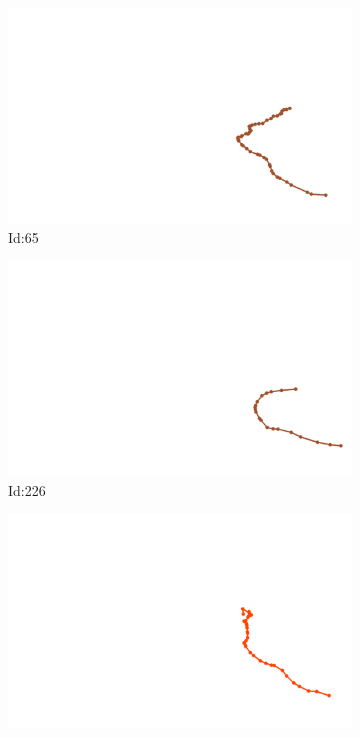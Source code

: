 \documentclass[12pt,twoside]{report}
\begin{document}
\begin{figure}
\centering
\begin{subfigure}[b]{0.20\textwidth}
\centering
\includegraphics[width=\textwidth]{../../trajectories/65.png}
\caption{Id:65}
\end{subfigure}
\begin{subfigure}[b]{0.20\textwidth}
\centering
\includegraphics[width=\textwidth]{../../trajectories/226.png}
\caption{Id:226}
\end{subfigure}
\begin{subfigure}[b]{0.20\textwidth}
\centering
\includegraphics[width=\textwidth]{../../trajectories/342.png}

\end{subfigure}
\end{figure}
\end{document}

